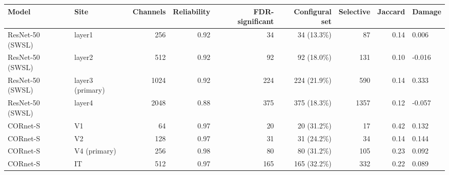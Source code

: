 \begin{tabular}{llrrrrrrl}
\hline
Model & Site & Channels & Reliability & FDR-significant & Configural set & Selective & Jaccard & Damage \\
\hline
ResNet-50 (SWSL) & layer1 & 256 & 0.92 & 34 & 34 (13.3\%) & 87 & 0.14 & 0.006 \\
ResNet-50 (SWSL) & layer2 & 512 & 0.92 & 92 & 92 (18.0\%) & 131 & 0.10 & -0.016 \\
ResNet-50 (SWSL) & layer3 (primary) & 1024 & 0.92 & 224 & 224 (21.9\%) & 590 & 0.14 & 0.333 \\
ResNet-50 (SWSL) & layer4 & 2048 & 0.88 & 375 & 375 (18.3\%) & 1357 & 0.12 & -0.057 \\
CORnet-S & V1 & 64 & 0.97 & 20 & 20 (31.2\%) & 17 & 0.42 & 0.132 \\
CORnet-S & V2 & 128 & 0.97 & 31 & 31 (24.2\%) & 34 & 0.14 & 0.144 \\
CORnet-S & V4 (primary) & 256 & 0.98 & 80 & 80 (31.2\%) & 105 & 0.23 & 0.092 \\
CORnet-S & IT & 512 & 0.97 & 165 & 165 (32.2\%) & 332 & 0.22 & 0.089 \\
\hline
\end{tabular}